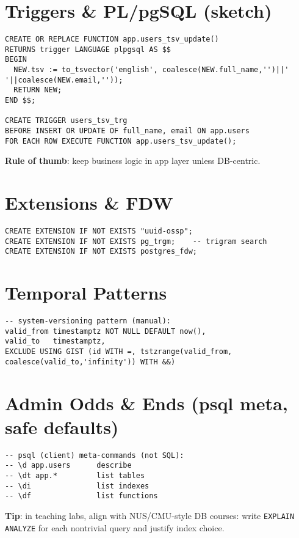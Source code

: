 \documentclass[10pt]{article}
\begin{document}
\section{Triggers \& PL/pgSQL (sketch)}
\begin{lstlisting}[style=psql]
CREATE OR REPLACE FUNCTION app.users_tsv_update()
RETURNS trigger LANGUAGE plpgsql AS $$
BEGIN
  NEW.tsv := to_tsvector('english', coalesce(NEW.full_name,'')||' '||coalesce(NEW.email,''));
  RETURN NEW;
END $$;

CREATE TRIGGER users_tsv_trg
BEFORE INSERT OR UPDATE OF full_name, email ON app.users
FOR EACH ROW EXECUTE FUNCTION app.users_tsv_update();
\end{lstlisting}
\textbf{Rule of thumb}: keep business logic in app layer unless DB-centric.

\section{Extensions \& FDW}
\begin{lstlisting}[style=psql]
CREATE EXTENSION IF NOT EXISTS "uuid-ossp";
CREATE EXTENSION IF NOT EXISTS pg_trgm;    -- trigram search
CREATE EXTENSION IF NOT EXISTS postgres_fdw;
\end{lstlisting}

\section{Temporal Patterns}
\begin{lstlisting}[style=psql]
-- system-versioning pattern (manual):
valid_from timestamptz NOT NULL DEFAULT now(),
valid_to   timestamptz,
EXCLUDE USING GIST (id WITH =, tstzrange(valid_from, coalesce(valid_to,'infinity')) WITH &&)
\end{lstlisting}

\section{Admin Odds \& Ends (psql meta, safe defaults)}
\begin{lstlisting}[style=psql]
-- psql (client) meta-commands (not SQL):
-- \d app.users      describe
-- \dt app.*         list tables
-- \di               list indexes
-- \df               list functions
\end{lstlisting}
\textbf{Tip}: in teaching labs, align with NUS/CMU-style DB courses: write \texttt{EXPLAIN ANALYZE} for each nontrivial query and justify index choice.
\end{document}

